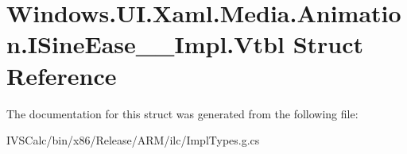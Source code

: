 \hypertarget{struct_windows_1_1_u_i_1_1_xaml_1_1_media_1_1_animation_1_1_i_sine_ease_____impl_1_1_vtbl}{}\section{Windows.\+U\+I.\+Xaml.\+Media.\+Animation.\+I\+Sine\+Ease\+\_\+\+\_\+\+Impl.\+Vtbl Struct Reference}
\label{struct_windows_1_1_u_i_1_1_xaml_1_1_media_1_1_animation_1_1_i_sine_ease_____impl_1_1_vtbl}


The documentation for this struct was generated from the following file\+:\begin{DoxyCompactItemize}
\item 
I\+V\+S\+Calc/bin/x86/\+Release/\+A\+R\+M/ilc/Impl\+Types.\+g.\+cs\end{DoxyCompactItemize}
